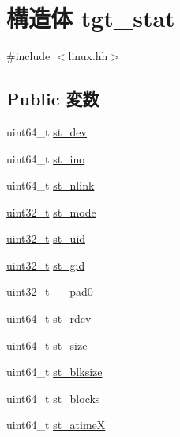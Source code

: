 \hypertarget{structArmLinux64_1_1tgt__stat}{
\section{構造体 tgt\_\-stat}
\label{structArmLinux64_1_1tgt__stat}
}


{\ttfamily \#include $<$linux.hh$>$}\subsection*{Public 変数}
\begin{DoxyCompactItemize}
\item 
uint64\_\-t \hyperlink{structArmLinux64_1_1tgt__stat_a0146849d3da5c91d9776888b14b82dcc}{st\_\-dev}
\item 
uint64\_\-t \hyperlink{structArmLinux64_1_1tgt__stat_abb54f0e7d91659ba9f4ab77a5392c08a}{st\_\-ino}
\item 
uint64\_\-t \hyperlink{structArmLinux64_1_1tgt__stat_abef7057bf9bf605a14cd64d34cf3424d}{st\_\-nlink}
\item 
\hyperlink{Type_8hh_a435d1572bf3f880d55459d9805097f62}{uint32\_\-t} \hyperlink{structArmLinux64_1_1tgt__stat_a75f55d064ed3b380b0315de36e178885}{st\_\-mode}
\item 
\hyperlink{Type_8hh_a435d1572bf3f880d55459d9805097f62}{uint32\_\-t} \hyperlink{structArmLinux64_1_1tgt__stat_ad5477a292a4edf27aa5766e01e0f5d1f}{st\_\-uid}
\item 
\hyperlink{Type_8hh_a435d1572bf3f880d55459d9805097f62}{uint32\_\-t} \hyperlink{structArmLinux64_1_1tgt__stat_a1faa6012541b83fd5218e2b229f876ec}{st\_\-gid}
\item 
\hyperlink{Type_8hh_a435d1572bf3f880d55459d9805097f62}{uint32\_\-t} \hyperlink{structArmLinux64_1_1tgt__stat_a8a67e7e5a583fb9e94edf6f27d30cb09}{\_\-\_\-pad0}
\item 
uint64\_\-t \hyperlink{structArmLinux64_1_1tgt__stat_ac430407fd3b0e421da1ee8f66c95a786}{st\_\-rdev}
\item 
uint64\_\-t \hyperlink{structArmLinux64_1_1tgt__stat_ae9a97f03571901a066d512b87bc36dba}{st\_\-size}
\item 
uint64\_\-t \hyperlink{structArmLinux64_1_1tgt__stat_adb9252bb3343471e4aaaf7bf7df5363a}{st\_\-blksize}
\item 
uint64\_\-t \hyperlink{structArmLinux64_1_1tgt__stat_a72c24b54949be7eaac849d71fc056a3c}{st\_\-blocks}
\item 
uint64\_\-t \hyperlink{structArmLinux64_1_1tgt__stat_a6602fcfc6e3137ac04ca7a50efbc3d34}{st\_\-atimeX}

\end{DoxyCompactItemize}
